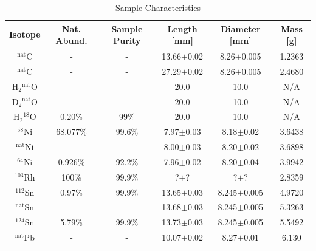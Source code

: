 \documentclass[twocolumn,secnumarabic,amssymb, nobibnotes, aps, prl,
superscriptaddress, nobalancelastpage]{revtex4}
\begin{document}
\begin{table}[ht]
    \caption{Sample Characteristics}
    \label{SampleTable}
    \begin{center}
        \begin{tabular}{ c c c c c c }
            \hline
            Isotope & Nat. Abund. & Sample Purity & Length [mm] & Diameter
            [mm] & Mass [g] \\
            \hline

            $^{\text{nat}}$C & - & - & 13.66$\pm$0.02 & 8.26$\pm$0.005 & 1.2363 \\
            $^{\text{nat}}$C & - & - & 27.29$\pm$0.02 & 8.26$\pm$0.005 & 2.4680 \\

            H$_{2}$$^{\text{nat}}$O & - & - & 20.0 & 10.0 & N/A \\
            D$_{2}$$^{\text{nat}}$O & - & - & 20.0 & 10.0 & N/A \\
            H$_{2}$$^{18}$O & 0.20\% & 99\% & 20.0 & 10.0 & N/A \\

            $^{58}$Ni & 68.077\% & 99.6\% & 7.97$\pm$0.03 & 8.18$\pm$0.02 &
            3.6438 \\
            $^{\text{nat}}$Ni & - & - & 8.00$\pm$0.03 & 8.20$\pm$0.02 &
            3.6898 \\
            $^{64}$Ni & 0.926\% & 92.2\% & 7.96$\pm$0.02 & 8.20$\pm$0.04 &
            3.9942 \\

            $^{103}$Rh & 100\% & 99.9\% & ?$\pm$? & ?$\pm$? & 2.8359 \\

            $^{112}$Sn & 0.97\% & 99.9\% & 13.65$\pm$0.03 & 8.245$\pm$0.005 &
            4.9720 \\
            $^{\text{nat}}$Sn & - & - & 13.68$\pm$0.03 & 8.245$\pm$0.005 &
            5.3263 \\
            $^{124}$Sn & 5.79\% & 99.9\% & 13.73$\pm$0.03 & 8.245$\pm$0.005 &
            5.5492 \\

            $^{\text{nat}}$Pb & - & - & 10.07$\pm$0.02 & 8.27$\pm$0.01 & 6.130 \\

            \hline
        \end{tabular}
    \end{center}
\end{table}
\end{document}
